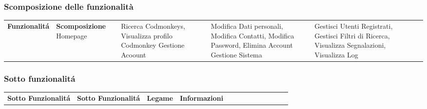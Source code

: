 \subsubsection{\Large Scomposizione delle funzionalità}

\phantom{M}%

\begin{center}




    \begin{tabularx}
        {\textwidth} {|X|X|}
        \hline  {}
        \n      {}
        \large \textbf{Funzionalitá} & \centering\large\textbf{Scomposizione}
        \n      Homepage             & Ricerca Codmonkeys, Visualizza profilo Codmonkey
        \n      Gestione Acoount     & Modifica Dati personali, Modifica Contatti, Modifica Password, Elimina Account
        \n      Gestione Sistema     & Gestisci Utenti Registrati, Gestisci Filtri di Ricerca, Visualizza Segnalazioni, Visualizza Log
        \n
    \end{tabularx}\label{tab:monkeytable:problema:tabellaScomposizioneDelleFunzionalita}


    \phantom{M}%


    \subsubsection{\Large Sotto funzionalitá}



    \begin{tabularx}
        {\textwidth}{|X|X|X|X|}
        \hline  {}
        \n{}
        \large \textbf{Sotto Funzionalitá} & \textbf{Sotto Funzionalitá} & \centering\large\textbf{Legame} & \centering\large\textbf{Informazioni}
        \n                                 &                             &                                 &
        \n                                 &                             &                                 &
        \n
    \end{tabularx}


\end{center}
